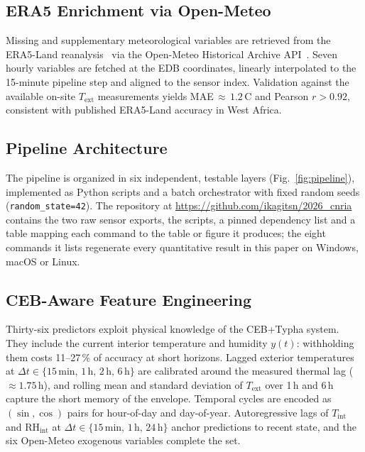 \documentclass[conference]{IEEEtran}
\newcommand{\repourl}{\url{https://github.com/ikagitsn/2026_cnria}}
\newcommand{\ceb}{CEB+Typha\xspace}
\begin{document}
\subsection{ERA5 Enrichment via Open-Meteo}
\label{ssec:era5}

Missing and supplementary meteorological variables are retrieved from
the ERA5-Land reanalysis~\cite{muñozsabater2021} via the Open-Meteo
Historical Archive API~\cite{zippenfenig2023}. Seven hourly variables
are fetched at the EDB coordinates, linearly interpolated to the
15-minute pipeline step and aligned to the sensor index. Validation
against the available on-site $T_\text{ext}$ measurements yields
MAE$\,{\approx}\,1.2$\,\textdegree{}C and Pearson $r>0.92$, consistent
with published ERA5-Land accuracy in West Africa.

\subsection{Pipeline Architecture}

The pipeline is organized in six independent, testable layers
(Fig.~\ref{fig:pipeline}), implemented as Python scripts and a
batch orchestrator with fixed random seeds
(\texttt{random\_state=42}). The repository at \repourl{} contains the
two raw sensor exports, the scripts, a pinned dependency list and a
table mapping each command to the table or figure it produces; the eight
commands it lists regenerate every quantitative result in this paper on
Windows, macOS or Linux.

\subsection{CEB-Aware Feature Engineering}
\label{ssec:features}

Thirty-six predictors exploit physical knowledge of the \ceb system.
They include the current interior temperature and humidity $y(t)$:
withholding them costs 11--27\,\% of accuracy at short horizons. Lagged
exterior temperatures at
$\Delta t \in \{15\,\text{min},\,1\,\text{h},\,2\,\text{h},\,6\,\text{h}\}$
are calibrated around the measured thermal lag (${\approx}1.75$\,h),
and rolling mean and standard deviation of $T_\text{ext}$ over 1\,h and
6\,h capture the short memory of the envelope. Temporal cycles are
encoded as $(\sin,\cos)$ pairs for hour-of-day and day-of-year.
Autoregressive lags of $T_\text{int}$ and $\text{RH}_\text{int}$ at
$\Delta t \in \{15\,\text{min},\,1\,\text{h},\,24\,\text{h}\}$ anchor
predictions to recent state, and the six Open-Meteo exogenous variables
complete the set.
\end{document}
